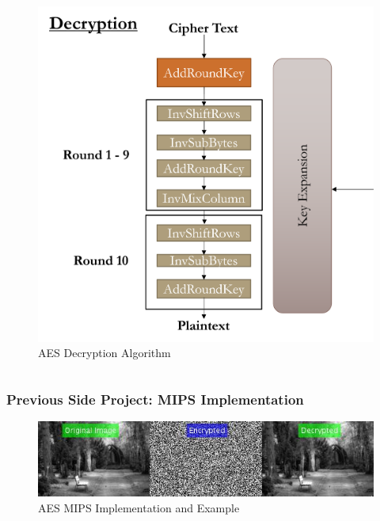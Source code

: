 \documentclass[
	11pt, %
	hmargin=1cm,vmargin=0cm,head=0.5cm,headsep=0pt,foot=0.5cm,margin=2cm
]{beamer}
\begin{document}
\begin{frame}
\begin{columns}[c]
		\begin{column}{0.45\textwidth} %
			\begin{figure}
				\includegraphics[width=\textwidth]{aes_decryption.png}
				\caption{AES Decryption Algorithm}
			\end{figure}
		\end{column}
	\end{columns}
\end{frame}

\begin{frame}
	\frametitle{Previous Side Project: MIPS Implementation}
	\begin{figure}
		\includegraphics[width=\textwidth]{182_coe301_side_project.jpg}
		\caption{AES MIPS Implementation and Example}
	\end{figure}
\end{frame}
\end{document}
